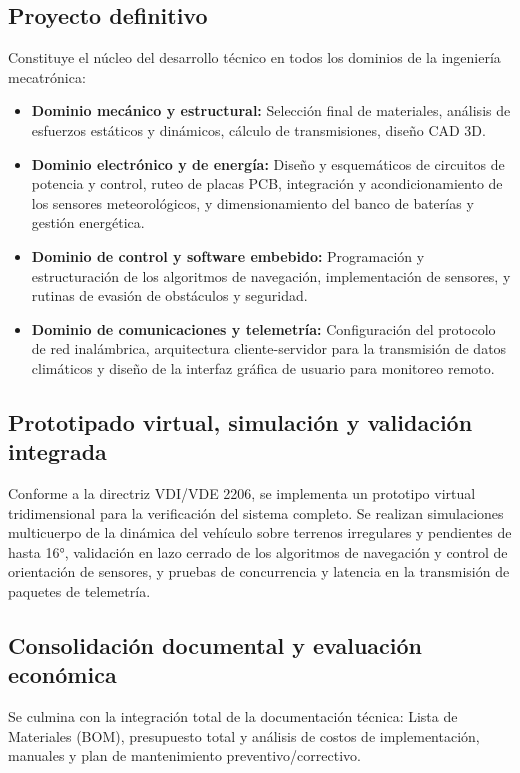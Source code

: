 \documentclass[../../General.tex]{subfiles}
\begin{document}
\subsection{Proyecto definitivo}
Constituye el núcleo del desarrollo técnico en todos los dominios de la ingeniería mecatrónica:
\begin{itemize} 
    \item \textbf{Dominio mecánico y estructural:} Selección final de materiales, análisis de esfuerzos estáticos y dinámicos, cálculo de transmisiones, diseño CAD 3D.
    \item \textbf{Dominio electrónico y de energía:} Diseño y esquemáticos de circuitos de potencia y control, ruteo de placas PCB, integración y acondicionamiento de los sensores meteorológicos, y dimensionamiento del banco de baterías y gestión energética.
    \item \textbf{Dominio de control y software embebido:} Programación y estructuración de los algoritmos de navegación, implementación de sensores, y rutinas de evasión de obstáculos y seguridad.
    \item \textbf{Dominio de comunicaciones y telemetría:} Configuración del protocolo de red inalámbrica, arquitectura cliente-servidor para la transmisión de datos climáticos y diseño de la interfaz gráfica de usuario para monitoreo remoto.
\end{itemize}

\subsection{Prototipado virtual, simulación y validación integrada}
Conforme a la directriz VDI/VDE 2206, se implementa un prototipo virtual tridimensional para la verificación del sistema completo. Se realizan simulaciones multicuerpo de la dinámica del vehículo sobre terrenos irregulares y pendientes de hasta 16°, validación en lazo cerrado de los algoritmos de navegación y control de orientación de sensores, y pruebas de concurrencia y latencia en la transmisión de paquetes de telemetría.

\subsection{Consolidación documental y evaluación económica}
Se culmina con la integración total de la documentación técnica: Lista de Materiales (BOM), presupuesto total y análisis de costos de implementación, manuales y plan de mantenimiento preventivo/correctivo.
\end{document}
